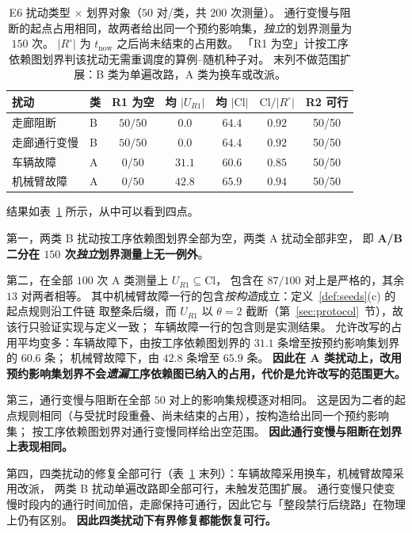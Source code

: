 \documentclass[manuscript,screen,review]{acmart}
\newcommand{\NPairs}{50}
\newcommand{\StrictlyLarger}{87/100}
\newcommand{\FeasESixBlock}{\NPairs/\NPairs}
\newcommand{\FeasSlow}{\NPairs/\NPairs}
\newcommand{\FeasESixAgv}{\NPairs/\NPairs}
\newcommand{\FeasESixRa}{\NPairs/\NPairs}
\begin{document}
\begin{table}[t]
\centering
\caption{E6 扰动类型 \(\times\) 划界对象（\(\NPairs\) 对/类，共 \(200\) 次测量）。
通行变慢与阻断的起点占用相同，故两者给出同一个预约影响集，\emph{独立}的划界测量为 \(150\) 次。
\(|R^{\circ}|\) 为 \(t_{\mathrm{now}}\) 之后尚未结束的占用数。
「R1 为空」计按工序依赖图划界判该扰动无需重调度的算例--随机种子对。
末列不做范围扩展：B 类为单遍改路，A 类为换车或改派。}
\label{tab:e6}
\small
\begin{tabular}{@{}llccccc@{}}
\toprule
扰动 & 类 & R1 为空 & 均 \(|U_{R1}|\) & 均 \(|\mathrm{Cl}|\)
 & \(\mathrm{Cl}/|R^{\circ}|\) & R2 可行 \\
\midrule
走廊阻断   & B & \(50/50\) & \(0.0\)  & \(64.4\) & \(0.92\) & \FeasESixBlock \\
走廊通行变慢 & B & \(50/50\) & \(0.0\)  & \(64.4\) & \(0.92\) & \FeasSlow \\
车辆故障   & A & \(0/50\)  & \(31.1\) & \(60.6\) & \(0.85\) & \FeasESixAgv \\
机械臂故障 & A & \(0/50\)  & \(42.8\) & \(65.9\) & \(0.94\) & \FeasESixRa \\
\bottomrule
\end{tabular}
\end{table}

结果如表~\ref{tab:e6} 所示，从中可以看到四点。

第一，两类 B 扰动按工序依赖图划界全部为空，两类 A 扰动全部非空，
即 \textbf{A/B 二分在 \(150\) 次\emph{独立}划界测量上无一例外}。

第二，在全部 \(100\) 次 A 类测量上 \(U_{R1}\subseteq\mathrm{Cl}\)，
包含在 \(\StrictlyLarger\) 对上是严格的，其余 \(13\) 对两者相等。
其中机械臂故障一行的包含\emph{按构造}成立：定义~\ref{def:seeds}(c) 的起点规则沿工件链
取整条后缀，而 \(U_{R1}\) 以 \(\theta=2\) 截断（第~\ref{sec:protocol}~节），故该行只验证实现与定义一致；
车辆故障一行的包含则是实测结果。
允许改写的占用平均变多：车辆故障下，由按工序依赖图划界的 \(31.1\) 条增至按预约影响集划界的 \(60.6\) 条；
机械臂故障下，由 \(42.8\) 条增至 \(65.9\) 条。
\textbf{因此在 A 类扰动上，改用预约影响集划界不会\emph{遗漏}工序依赖图已纳入的占用，代价是允许改写的范围更大。}

第三，通行变慢与阻断在全部 \(50\) 对上的影响集规模逐对相同。
这是因为二者的起点规则相同（与受扰时段重叠、尚未结束的占用），按构造给出同一个预约影响集；
按工序依赖图划界对通行变慢同样给出空范围。
\textbf{因此通行变慢与阻断在划界上表现相同。}

第四，四类扰动的修复全部可行（表~\ref{tab:e6} 末列）：车辆故障采用换车，机械臂故障采用改派，
两类 B 扰动单遍改路即全部可行，未触发范围扩展。
通行变慢只使变慢时段内的通行时间加倍，走廊保持可通行，因此它与「整段禁行后绕路」在物理上仍有区别。
\textbf{因此四类扰动下有界修复都能恢复可行。}
\end{document}
